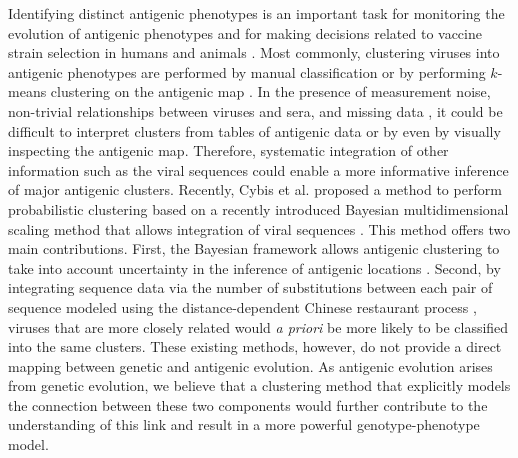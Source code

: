 \documentclass[11pt,oneside,letterpaper]{article}
\begin{document}
Identifying distinct antigenic phenotypes is an important task for monitoring the evolution of antigenic phenotypes and for making decisions related to vaccine strain selection in humans and animals \cite{smith_mapping_2004, fouchier_use_2010}.
Most commonly, clustering viruses into antigenic phenotypes are performed by manual classification or by performing $k$-means clustering on the antigenic map \cite{smith_mapping_2004}. 
In the presence of measurement noise, non-trivial relationships between viruses and sera, and missing data \cite{cai_computational_2010}, it could be difficult to interpret clusters from tables of antigenic data or by even by visually inspecting the antigenic map. 
Therefore, systematic integration of other information such as the viral sequences could enable a more informative inference of major antigenic clusters.
Recently, Cybis et al. \cite{cybis_bayesian_2015} proposed a method to perform probabilistic clustering based on a recently introduced Bayesian multidimensional scaling method \cite{oh_bayesian_2001} that allows integration of viral sequences \cite{bedford_integrating_2014}. 
This method offers two main contributions. 
First, the Bayesian framework allows antigenic clustering to take into account uncertainty in the inference of antigenic locations \cite{bedford_integrating_2014}.
Second, by integrating sequence data via the number of substitutions between each pair of sequence modeled using the distance-dependent Chinese restaurant process \cite{blei_distance_2011}, viruses that are more closely related would \textit{a priori} be more likely to be classified into the same clusters. 
These existing methods, however, do not provide a direct mapping between genetic and antigenic evolution. 
As antigenic evolution arises from genetic evolution, we believe that a clustering method that explicitly models the connection between these two components would further contribute to the understanding of this link and result in a more powerful genotype-phenotype model.

\end{document}
